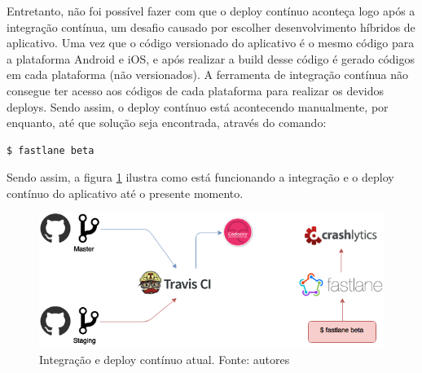 Entretanto, não foi possível fazer com que o deploy contínuo aconteça logo após a integração contínua, um desafio causado por escolher desenvolvimento híbridos de aplicativo. Uma vez que o código versionado do aplicativo é o mesmo código para a plataforma Android e iOS, e após realizar a build desse código é gerado códigos em cada plataforma (não versionados). A ferramenta de integração contínua não consegue ter acesso aos códigos de cada plataforma para realizar os devidos deploys. Sendo assim, o deploy contínuo está acontecendo manualmente, por enquanto, até que solução seja encontrada, através do comando:

\begin{lstlisting}[language=bash]
  $ fastlane beta
\end{lstlisting}

Sendo assim, a figura \ref{img:integracao_deploy_continuo_atual} ilustra como está funcionando a integração e o deploy contínuo do aplicativo até o presente momento.

\begin{figure}[H]
    \centering
    \includegraphics[scale=0.5]{figuras/ci_currently.png}
    \caption[Integração e deploy contínuo atual]{Integração e deploy contínuo atual. Fonte: autores}
    \label{img:integracao_deploy_continuo_atual}
\end{figure}
